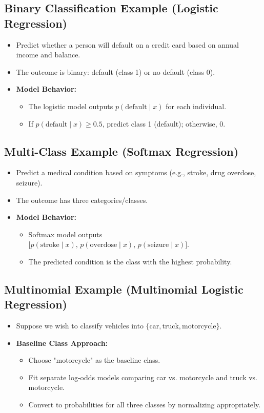 \documentclass[10pt]{article}
\begin{document}
\subsection{Binary Classification Example (Logistic Regression)}
\begin{itemize}
    \item Predict whether a person will default on a credit card based on annual income and balance.
    \item The outcome is binary: default (class 1) or no default (class 0).
    \item \textbf{Model Behavior:}
    \begin{itemize}
        \item The logistic model outputs \(p(\text{default}\mid x)\) for each individual.
        \item If \(p(\text{default}\mid x)\ge 0.5\), predict class 1 (default); otherwise, 0.
    \end{itemize}
\end{itemize}

\subsection{Multi-Class Example (Softmax Regression)}
\begin{itemize}
    \item Predict a medical condition based on symptoms (e.g., stroke, drug overdose, seizure).
    \item The outcome has three categories/classes.
    \item \textbf{Model Behavior:}
    \begin{itemize}
        \item Softmax model outputs \(\bigl[p(\text{stroke}\mid x),\, p(\text{overdose}\mid x),\, p(\text{seizure}\mid x)\bigr]\).
        \item The predicted condition is the class with the highest probability.
    \end{itemize}
\end{itemize}

\subsection{Multinomial Example (Multinomial Logistic Regression)}
\begin{itemize}
    \item Suppose we wish to classify vehicles into \(\{\text{car}, \text{truck}, \text{motorcycle}\}\).
    \item \textbf{Baseline Class Approach:}
    \begin{itemize}
        \item Choose "motorcycle" as the baseline class.
        \item Fit separate log-odds models comparing car vs. motorcycle and truck vs. motorcycle.
        \item Convert to probabilities for all three classes by normalizing appropriately.
    \end{itemize}
\end{itemize}
\end{document}
